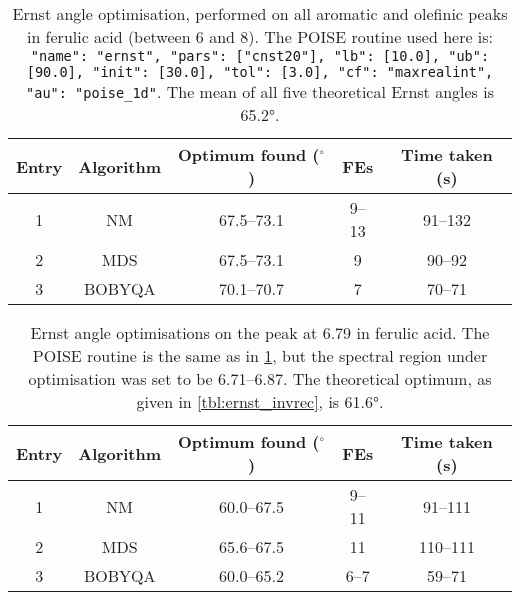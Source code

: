\begin{table}[htb]
    \centering
    \begin{tabular}{ccccc}
        \toprule
        Entry & Algorithm & Optimum found ($^\circ$) & FEs   & Time taken (\unit{\s}) \\
        \midrule
        1     & NM        & 67.5--73.1               & 9--13 & 91--132              \\
        2     & MDS       & 67.5--73.1               & 9     & 90--92               \\
        3     & BOBYQA    & 70.1--70.7               & 7     & 70--71               \\
        \bottomrule
    \end{tabular}
    \caption[Ernst angle optimisations on a range of peaks]{
        Ernst angle optimisation, performed on all aromatic and olefinic peaks in ferulic acid (between 6 and \qty{8}{\ppm}).
        The POISE routine used here is: \texttt{{"name": "ernst", "pars": ["cnst20"], "lb": [10.0], "ub": [90.0], "init": [30.0], "tol": [3.0], "cf": "maxrealint", "au": "poise_1d"}}.
        The mean of all five theoretical Ernst angles is \ang{65.2}.
    }
    \label{tbl:poise_ernst_fivepeaks}
\end{table}

\begin{table}[htb]
    \centering
    \begin{tabular}{ccccc}
        \toprule
        Entry & Algorithm & Optimum found ($^\circ$) & FEs   & Time taken (\unit{\s}) \\
        \midrule
        1     & NM        & 60.0--67.5               & 9--11 & 91--111              \\
        2     & MDS       & 65.6--67.5               & 11    & 110--111             \\
        3     & BOBYQA    & 60.0--65.2               & 6--7  & 59--71               \\
        \bottomrule
    \end{tabular}
    \caption[Ernst angle optimisations on only one peak]{
        Ernst angle optimisations on the peak at \qty{6.79}{\ppm} in ferulic acid.
        The POISE routine is the same as in \cref{tbl:poise_ernst_fivepeaks}, but the spectral region under optimisation was set to be 6.71--\qty{6.87}{\ppm}.
        The theoretical optimum, as given in \cref{tbl:ernst_invrec}, is \ang{61.6}.
    }
    \label{tbl:poise_ernst_onepeak}
\end{table}

